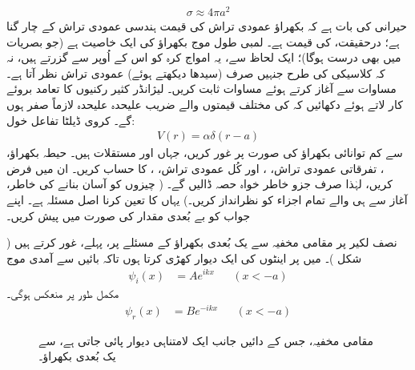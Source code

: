 \begin{align}
	\sigma\approx4\pi a^2
\end{align}
حیرانی کی بات ہے کہ بکھراؤ عمودی تراش کی قیمت ہندسی عمودی تراش کے چار گنا ہے؛ درحقیقت،  کی قیمت  ہے۔ لمبی طول موج بکھراؤ کی ایک خاصیت  ہے (جو بصریات میں بھی درست ہوگا)؛ ایک لحاظ سے، یہ امواج کرہ کو  اس کے اُوپر سے گزرتے ہیں، نہ کہ کلاسیکی  کی طرح جنہیں صرف (سیدھا دیکھتے ہوئے) عمودی تراش نظر آتا ہے۔
مساوات  سے آغاز کرتے ہوئے مساوات  ثابت کریں۔  لیژانڈر کثیر رکنیوں کا تعامد بروئے کار لاتے ہوئے دکھائیں کہ  کی مختلف قیمتوں والے  ضریب  علیحدہ علیحدہ لازماً صفر ہوں گے۔
کروی ڈیلٹا تفاعل خول:
\begin{align*}
	V(r) = \alpha\delta(r-a)
\end{align*}
سے کم توانائی بکھراؤ کی صورت پر غور کریں، جہاں  اور  مستقلات ہیں۔ حیطہ بکھراؤ، ، تفرقاتی عمودی تراش، ، اور کُل عمودی تراش، ، کا حساب کریں۔ ان میں  فرض کریں، لہٰذا صرف  جزو خاطر خواہ حصہ ڈالیں گے۔ ( چیزوں کو آسان بنانے کی خاطر، آغاز سے ہی  والے تمام اجزاء کو نظرانداز کریں۔) یہاں  کا تعین کرنا اصل مسئلہ ہے۔ اپنے جواب کو بے بُعدی مقدار  کی صورت میں پیش کریں۔

 	


 نصف لکیر  پر مقامی مخفیہ  سے یک بُعدی بکھراؤ کے مسئلے پر، پہلے، غور کرتے ہیں ( شکل )۔ میں  پر اینٹوں کی ایک دیوار کھڑی کرتا ہوں تاکہ بائیں سے آمدی موج 
\begin{align}
	\psi_i(x) &= Ae^{ikx}&&(x<-a)
\end{align}
مکمل طور پر منعکس ہوگی۔
\begin{align}
	\psi_r(x) &= Be^{-ikx}&&(x<-a)
\end{align}
%
\begin{figure}
\centering
{}
\caption{مقامی مخفیہ، جس کے دائیں جانب ایک لامتناہی دیوار پائی جاتی ہے، سے یک بُعدی بکھراؤ۔}
\label{شکل_بکھراو_یک_بعدی_مقامی_مخفیہ}
\end{figure}

